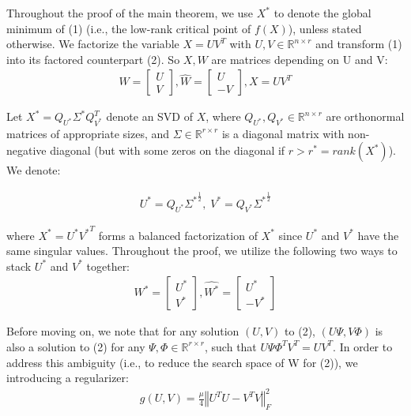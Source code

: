 \documentclass{article}
\begin{document}
Throughout the proof of the main theorem, we use $X^*$ to denote the global minimum of (1) (i.e., the low-rank critical point of $f(X)$), unless stated otherwise. We factorize the variable $X =UV^T$ with $U, V\in \mathbb{R}^{n\times r}$ and transform (1) into its factored counterpart (2). So $X,W$ are matrices depending on U and V:
\begin{align*}
        W=\left[\begin{array}{c}
U\\
V
\end{array}\right],\hat{W}=\left[\begin{array}{c}
U\\
-V
\end{array}\right],X=UV^{T}
\end{align*}

Let $X^* = Q_{U^*}\Sigma^*Q_{V^*}^T$ denote an SVD of $X$, where $Q_{U^*}, Q_{V^*}\in \mathbb{R}^{n\times r}$ are orthonormal matrices of appropriate sizes, and $\Sigma\in\mathbb{R}^{r\times r}$ is a diagonal matrix with non-negative diagonal (but with some zeros on the diagonal if $r > r^*= rank(X^*)$). We denote:

\begin{align*}
    U^* = Q_{U^*}{\Sigma^*}^{\frac{1}{2}}, \; V^* = Q_{V^*}{\Sigma^*}^{\frac{1}{2}}
\end{align*}

where $X^* = U^* {V^*}^T$ forms a balanced factorization of $X^*$ since $U^*$ and $V^*$ have the same singular values. Throughout the proof, we utilize the following two ways to stack $U^*$ and $V^*$ together:
\begin{align*}
        W^*=\left[\begin{array}{c}
U^*\\
V^*
\end{array}\right],\hat{W^*}=\left[\begin{array}{c}
U^*\\
-V^*
\end{array}\right]
\end{align*}

Before moving on, we note that for any solution $(U , V )$ to (2), $(U\Psi, V\Phi)$ is also a solution to (2) for any $\Psi,\Phi\in\mathbb{R}^{r\times r}$, such that $U\Psi\Phi^T V^T = UV^T$. In order to address this ambiguity (i.e., to reduce the search space of W for (2)), we introducing a regularizer:
\begin{align}
    g\left(U,V\right)=\frac{\mu}{4}\left\Vert U^TU-V^TV\right\Vert^2_F
\end{align}
\end{document}
